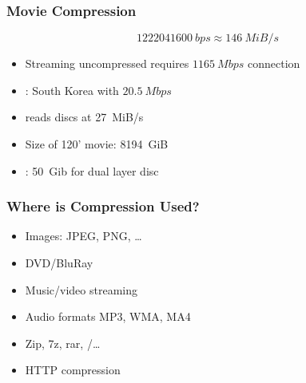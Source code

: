 \documentclass{../ucll-slides}
\begin{document}
\begin{frame}
  \frametitle{Movie Compression}
  \[
    \SI{1222041600}{bps} \approx \SI{146}{MiB/s}
  \]
  \vskip5mm
  \begin{itemize}
    \item Streaming uncompressed requires $\SI{1165}{Mbps}$ connection
    \item {}: South Korea with $\SI{20.5}{Mbps}$
  \end{itemize}
  \vskip5mm
  \begin{itemize}
    \item {} reads discs at \SI{27}{MiB/s}
    \item Size of 120' movie: \SI{8194}{GiB}
    \item {}: \SI{50}{Gib} for dual layer disc
  \end{itemize}
\end{frame}

\begin{frame}
  \frametitle{Where is Compression Used?}
  \begin{itemize}
    \item Images: JPEG, PNG, \dots
    \item DVD/BluRay
    \item Music/video streaming
    \item Audio formats MP3, WMA, MA4
    \item Zip, 7z, rar, /\dots
    \item HTTP compression
  \end{itemize}
\end{frame}
\end{document}
